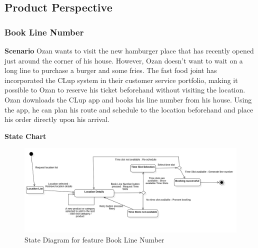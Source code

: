 \subsection{Product Perspective}




\subsubsection{Book Line Number}
\textbf{Scenario}
Ozan wants to visit the new hamburger place that has recently opened just around the corner of his house.
However, Ozan doesn't want to wait on a long line to purchase a burger and some fries.
The fast food joint has incorporated the CLup system in their customer service portfolio, making it possible to Ozan to reserve his ticket beforehand without visiting the location.
Ozan downloads the CLup app and books his line number from his house.
Using the app, he can plan his route and schedule to the location beforehand and place his order directly upon his arrival.

\textbf{State Chart}

\begin{figure}[H]
    \centering
    \includegraphics[height=0.4\textwidth]{Images/StateCharts/BookLineNumber.png}
    \caption{State Diagram for feature Book Line Number}
    \label{fig:SDBookLine}
\end{figure}

